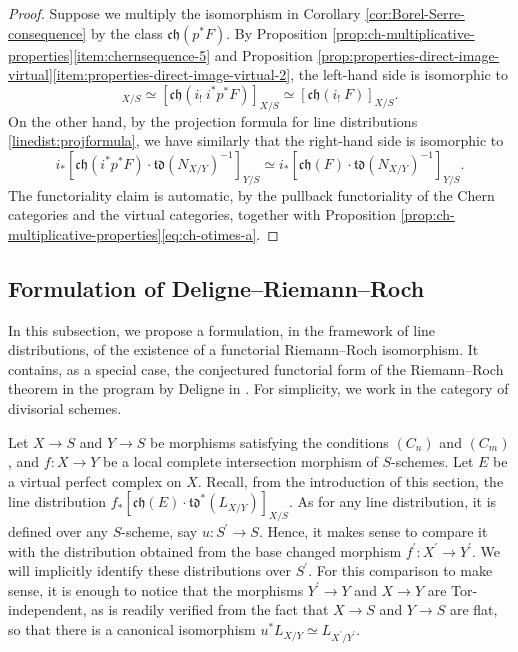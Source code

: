 \documentclass[11pt]{article}
\theoremstyle{plain}
\theoremstyle{definition}
\newcommand{\Ocal}{\mathcal O}
\newcommand{\chfrak}{\mathfrak {ch}}
\newcommand{\tdfrak}{\mathfrak {td}}
\begin{document}
\begin{proof}
Suppose we multiply the isomorphism in Corollary \ref{cor:Borel-Serre-consequence} by the class $\chfrak(p^\ast F)$. By Proposition \ref{prop:ch-multiplicative-properties}\eqref{item:chernsequence-5} and Proposition \ref{prop:properties-direct-image-virtual}\eqref{item:properties-direct-image-virtual-2}, the left-hand side is isomorphic to\vspace*{-3pt}
\begin{displaymath}
[\chfrak(p^\ast F \otimes i_!\ \Ocal_X)]_{X/S} \simeq [\chfrak(i_!\ i^\ast p^\ast F)]_{X/S} \simeq [\chfrak(i_!\ F)]_{X/S}.
\end{displaymath}
On the other hand, by the projection formula for line distributions \eqref{linedist:projformula}, we have similarly that the right-hand side is isomorphic to\vspace*{-3pt}
\begin{displaymath}
i_\ast [\chfrak(i^\ast p^\ast F) \cdot \tdfrak(N_{X/Y})^{-1}]_{Y/S} \simeq i_\ast [\chfrak(F) \cdot \tdfrak(N_{X/Y})^{-1}]_{Y/S}.
\end{displaymath}
The functoriality claim is automatic, by the pullback functoriality of the Chern categories and the virtual categories, together with Proposition \ref{prop:ch-multiplicative-properties}\eqref{eq:ch-otimes-a}.
\end{proof}
\subsection{Formulation of Deligne--Riemann--Roch}\label{subsec:FormDRR}
In this subsection, we propose a formulation, in the framework of line distributions, of the existence of a functorial Riemann--Roch isomorphism. It contains, as a special case, the conjectured functorial form of the Riemann--Roch theorem in the program by Deligne in \cite{Deligne-determinant}. For simplicity, we work in the category of divisorial schemes.

Let $X\to S$ and $Y\to S$ be morphisms satisfying the conditions $(C_{n})$ and $(C_{m})$, and $f\colon X\to Y$ be a local complete intersection morphism of $S$-schemes. Let $E$ be a virtual perfect complex on $X$. Recall, from the introduction of this section, the line distribution $f_{\ast}[\chfrak(E)\cdot\tdfrak^{\ast}(L_{X/Y})]_{X/S}$. As for any line distribution, it is defined over any $S$-scheme, say $u: S^{\prime}\to S$. Hence, it makes sense to compare it with the distribution obtained from the base changed morphism $f^{\prime}: X^{\prime} \to Y^{\prime}$. We will implicitly identify these distributions over $S^{\prime}$. For this comparison to make sense, it is enough to notice that the morphisms $Y^{\prime} \to Y$ and $X \to Y$ are Tor-independent, as is readily verified from the fact that $X \to S$ and $Y \to S$ are flat, so that there is a canonical isomorphism $u^{\ast} L_{X/Y} \simeq L_{X^{\prime}/Y^{\prime} }$.
\end{document}
